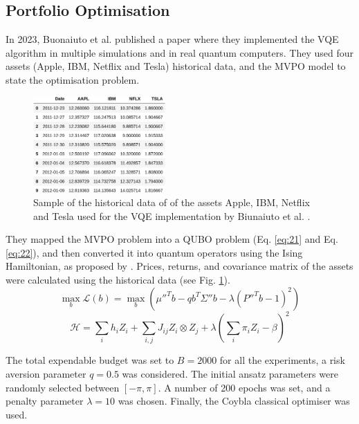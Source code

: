 \documentclass[prx,twocolumn,floatfix,superscriptaddress,longbibliography]{revtex4-1}
\begin{document}
\subsection{Portfolio Optimisation}
In 2023, Buonaiuto et al. \cite{Buonaiuto2023} published a paper where they implemented the VQE algorithm in multiple simulations and in real quantum computers. They used four assets (Apple, IBM, Netflix and Tesla) 
historical data, and the MVPO model to state the optimisation problem. 
\begin{figure}[h!]
\centering 
\includegraphics[width=0.45\textwidth]{data-paper.png}
  \caption{\label{fig:data-set} Sample of the historical data of of the assets Apple, IBM, Netflix and Tesla used for the VQE implementation by 
Biunaiuto et al. \cite{Buonaiuto2023}.}
\end{figure}

They mapped the MVPO problem into a QUBO problem (Eq. \ref{eq:21} and Eq. \ref{eq:22}), and then converted it into quantum operators using 
the Ising Hamiltonian, as proposed by \cite{Tilly2022}.  Prices, returns, and covariance matrix of the assets were calculated using the historical data (see Fig. \ref{fig:data-set}). 
\begin{equation}
  \label{eq:21}
  \max_{b} \mathcal{L}(b) =\max_{b}\left(\mu''^{T} b - qb^{T} \Sigma'' b - \lambda(P''^{T}b- 1)^2\right)
\end{equation}
\begin{equation}
  \label{eq:22}
  \mathcal{H} = \sum_{i} h_i Z_i + \sum_{i,j} J_{ij} Z_i\otimes Z_j + \lambda \left(\sum_{i}\pi_i Z_i -\beta\right)^2
\end{equation}

The total expendable budget was set to $B=2000$ for all the experiments, a risk aversion parameter $q=0.5$ was considered. The initial ansatz parameters were randomly selected between $[-\pi, \pi]$. A number of 200 epochs was set, and a penalty parameter $\lambda=10$  was chosen. Finally, the Coybla classical optimiser was used. 
\end{document}
